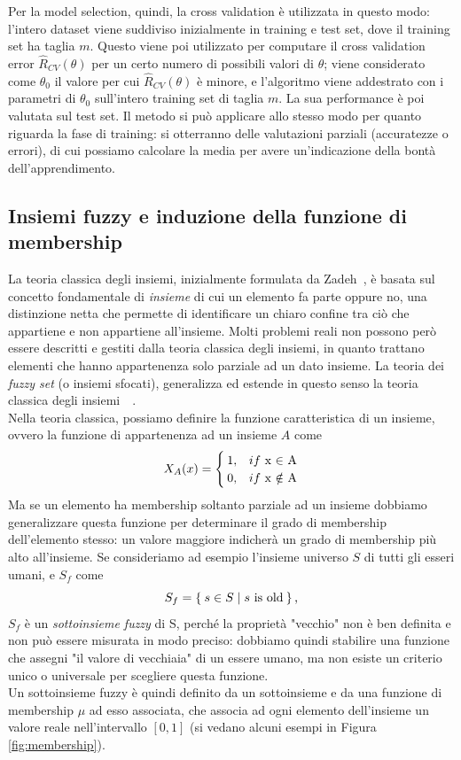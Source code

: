 \documentclass{article}
\begin{document}
	Per la model selection, quindi, la cross validation è utilizzata in questo modo: l'intero dataset viene suddiviso inizialmente in training e test set, dove il training set ha taglia $m$. Questo viene poi utilizzato per computare il cross validation error $\widehat{R}_{CV}(\theta)$ per un certo numero di possibili valori di $\theta$; viene considerato come $\theta_0$ il valore per cui $\widehat{R}_{CV}(\theta)$ è minore, e l'algoritmo viene addestrato con i parametri di $\theta_0$ sull'intero training set di taglia $m$. La sua performance è poi valutata sul test set.
	Il metodo si può applicare allo stesso modo per quanto riguarda la fase di training: si otterranno delle valutazioni parziali (accuratezze o errori), di cui possiamo calcolare la media per avere un'indicazione della bontà dell'apprendimento.
	
	\subsection{Insiemi fuzzy e induzione della funzione di membership}
	La teoria classica degli insiemi, inizialmente formulata da Zadeh~\cite{bib:zadeh}, è basata sul concetto fondamentale di \textit{insieme} di cui un elemento fa parte oppure no, una distinzione netta che permette di identificare un chiaro confine tra ciò che appartiene e non appartiene all'insieme. Molti problemi reali non possono però essere descritti e gestiti dalla teoria classica degli insiemi, in quanto trattano elementi che hanno appartenenza solo parziale ad un dato insieme. La teoria dei \textit{fuzzy set} (o insiemi sfocati), generalizza ed estende in questo senso la teoria classica degli insiemi~\cite{bib:fuzzy}~\cite{bib:fuzzy2}.\\
	Nella teoria classica, possiamo definire la funzione caratteristica di un insieme, ovvero la funzione di appartenenza ad un insieme $A$ come
	\[
	X_A(x)=
	\begin{cases}
	1, & if $ x $ \in $ A$\\
	0, & if $ x $ \notin $ A$
	\end{cases}
	\]
	Ma se un elemento ha membership soltanto parziale ad un insieme dobbiamo generalizzare questa funzione per determinare il grado di membership dell'elemento stesso: un valore maggiore indicherà un grado di membership più alto all'insieme. Se consideriamo ad esempio l'insieme universo $S$ di tutti gli esseri umani, e $S_f$ come
	\[
	S_f=\Set{s \in S | s \text{ is old}}\text{,}
	\]
	$S_f$ è un \textit{sottoinsieme fuzzy} di S, perché la proprietà "vecchio" non è ben definita e non può essere misurata in modo preciso: dobbiamo quindi stabilire una funzione che assegni "il valore di vecchiaia" di un essere umano, ma non esiste un criterio unico o universale per scegliere questa funzione.\\
	Un sottoinsieme fuzzy è quindi definito da un sottoinsieme e da una funzione di membership $\mu$ ad esso associata, che associa ad ogni elemento dell'insieme un valore reale nell'intervallo $[0,1]$ (si vedano alcuni esempi in Figura \ref{fig:membership}).\\
\end{document}
